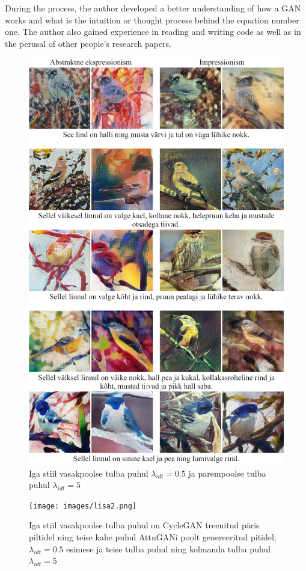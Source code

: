 \documentclass{vilgym}
\begin{document}
    During the process, the author developed a better understanding of how a GAN works and what is the intuition or thought process behind the equation number one. The author also gained experience in reading and writing code as well as in the perusal of other people's research papers.
	\nocite{*} %
	\printbibliography[title={Kasutatud allikad}]

	\appendices
	
	\begin{figure}[H]
		\includegraphics[width=0.8\linewidth]{images/lisa1.png}
		\caption{Iga stiil vasakpoolse tulba puhul $ \lambda_{idt} = 0.5 $ ja parempoolse tulba puhul $ \lambda_{idt} = 5 $}
		\label{fig:lisa1}
	\end{figure}

	\begin{figure}[H]
		\texttt{[image: images/lisa2.png]}
		\caption{Iga stiil vasakpoolse tulba puhul on CycleGAN treenitud päris piltidel ning teise kahe puhul AttnGANi poolt genereeritud pitidel; $ \lambda_{idt} = 0.5 $ esimese ja teise tulba puhul ning kolmanda tulba puhul $ \lambda_{idt} = 5 $}
		\label{fig:lisa2}
	\end{figure}
\end{document}
